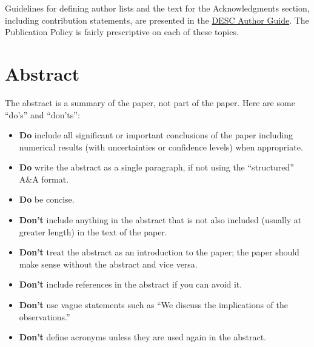 \documentclass[letterpaper,11pt]{article}
\begin{document}
Guidelines for defining author lists and the text for the Acknowledgments section, including contribution statements, are presented in the \href{https://github.com/LSSTDESC/Author_Guide/blob/compiled/Author_Guide.pdf}{DESC Author Guide}.  The Publication Policy is fairly prescriptive on each of these topics.

\section{Abstract}

The abstract is a summary of the paper, not part of the paper. Here are some ``do's'' and ``don'ts'': 
\begin{itemize}
\item {\bf Do} include all significant or important conclusions of the paper including numerical results (with uncertainties or confidence levels) when appropriate.
\item {\bf Do} write the abstract as a single paragraph, if not using the ``structured'' A\&A format.  
\item {\bf Do} be concise.
\item {\bf Don't} include anything in the abstract that is not also included (usually at greater length) in the text of the paper.
\item {\bf Don't} treat the abstract as an introduction to the paper; the paper should make sense without the abstract and vice versa.
\item {\bf Don't} include references in the abstract if you can avoid it.
\item {\bf Don't} use vague statements such as ``We discuss the implications of the observations.''
\item {\bf Don't} define acronyms unless they are used again in the abstract. 
\end{itemize}





\end{document}
